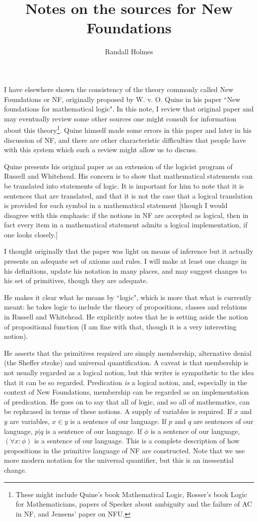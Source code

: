 \documentclass[12pt]{article}
\title{Notes on the sources for New Foundations}
\author{Randall Holmes}
\begin{document}
\maketitle

I have elsewhere shown the consistency of the theory commonly called New Foundations or NF, originally proposed by W. v. O. Quine in his paper ``New foundations for mathematical logic".  In this note, I review that original paper and may eventually review some other sources one might consult for information about this theory\footnote{These might include Quine's book Mathematical Logic, Rosser's book Logic for Mathematicians, papers of Specker about ambiguity and the failure of AC in NF, and Jensens' paper on NFU.}.   Quine himself made some errors in this paper and later in his discussion of NF, and there are other characteristic difficulties that people have with this system which such a review might allow us to discuss.

Quine presents his original paper as an extension of the logicist program of Russell and Whitehead.  His concern is to show that mathematical statements can be translated into statements of logic.  It is important for him to note that it is sentences that are translated, and that it is not the case that a logical translation is provided for each symbol in a mathematical statement [though I would disagree with this emphasis:  if the notions in NF are accepted as logical, then in fact every item in a mathematical statement admits a logical implementation, if one looks closely.]

I thought originally that the paper was light on means of inference but it actually presents an adequate set of axioms and rules.  I will make at least one change in his definitions, update his notation in many places, and may suggest changes to his set of primitives, though they are adequate.

He makes it clear what he means by ``logic", which is more that what is currently meant:  he takes logic to include the theory of propositions, classes and relations in Russell and Whitehead.  He explicitly notes that he is setting aside the notion of propositional function (I am fine with that, though it is a very interesting notion).

He asserts that the primitives required are simply membership, alternative denial (the Sheffer stroke) and universal quantification.   A caveat is that membership is not usually regarded as a logical notion, but this writer is sympathetic to the idea that it can be so regarded.  Predication {\em is\/} a logical notion, and, especially in the context of New Foundations, membership can be regarded as an implementation of predication.  He goes on to say that all of logic, and so all of mathematics, can be rephrased in terms of these notions.  A supply of variables is required.  If $x$ and $y$ are variables, $x \in y$ is a sentence of our language.  If $p$ and $q$ are sentences of our language, $p|q$ is a sentence of our language.  If $\phi$ is a sentence of our language, $(\forall x:\phi)$ is a sentence of our language. This is a complete description of how propositions in the primitive language of NF are constructed.  Note that we use more modern notation for the universal quantifier, but this is an inessential change.
\end{document}

